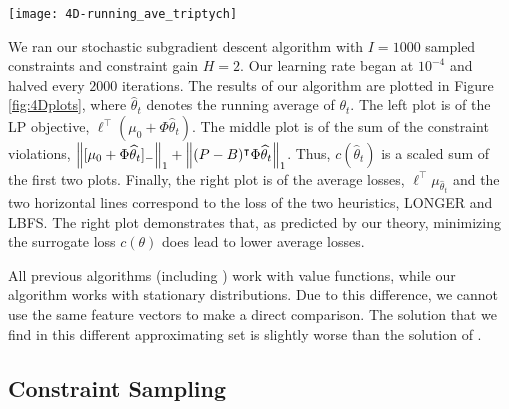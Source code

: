 \documentclass[11pt]{article}
\begin{document}
\begin{figure*}[t]
\centering
\texttt{[image: 4D-running\_ave\_triptych]}
\caption{
\label{fig:4Dplots}
The left plot is of the linear objective of the running average, i.e. $\ell^\top \Phi\widehat\theta_t$. The center plot is the sum of the two constraint violations of $\widehat\theta_t$, and the right plot is $\ell^\top \tilde\mu_{\widehat\theta_t}$ (the average loss of the derived policy). The two horizontal lines correspond to the loss of the two heuristics, LONGER and LBFS.}
\end{figure*}

We ran our stochastic subgradient descent algorithm with $I=1000$ sampled constraints and constraint gain $H=2$. Our learning rate began at $10^{-4}$ and halved every $2000$ iterations. The results of our algorithm are plotted in Figure \ref{fig:4Dplots}, where $\widehat\theta_t$ denotes the running average of $\theta_t$. The left plot is of the LP objective, $\ell^\top(\mu_0+\Phi\widehat\theta_t)$. The middle plot is of the sum of the constraint violations, $\left\Vert[\mu_0+\Phi\widehat\theta_t]_{-} \right\Vert_1+ \left\Vert(P-B)^\intercal\Phi\widehat\theta_t \right\Vert_1$. Thus, $c(\widehat\theta_t)$ is a scaled sum of the first two plots. Finally, the right plot is of the average losses, $\ell^\top\mu_{\widehat\theta_t}$ and the two horizontal lines correspond to the loss of the two heuristics, LONGER and LBFS. The right plot demonstrates that, as predicted by our theory, minimizing the surrogate loss $c(\theta)$ does lead to lower average losses.

All previous algorithms (including \cite{DeFarias-VanRoy-2003}) work with value functions, while our algorithm works with stationary distributions. Due to this difference, we cannot use the same feature vectors to make a direct comparison. The solution that we find in this different approximating set is slightly worse than the solution of \citet{DeFarias-VanRoy-2003}.

\iffalse
\subsection{Constraint Sampling}
\label{sec:const-sampling-exps}
\end{document}
